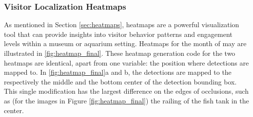 \subsubsection{Visitor Localization Heatmaps}
\label{sec:results_heatmaps}
As mentioned in Section \ref{sec:heatmaps}, heatmaps are a powerful visualization tool that can provide insights into visitor behavior patterns and engagement levels within a museum or aquarium setting. Heatmaps for the month of may are illustrated in \ref{fig:heatmap_final}. These heatmap generation code for the two heatmaps are identical, apart from one variable: the position where detections are mapped to. In \ref{fig:heatmap_final}a and b, the detections are mapped to the respectively the middle and the bottom center of the detection bounding box. This single modification has the largest difference on the edges of occlusions, such as (for the images in Figure \ref{fig:heatmap_final}) the railing of the fish tank in the center.

